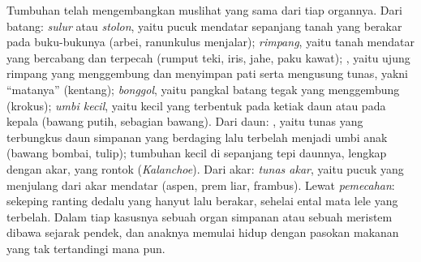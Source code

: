 \begin{proposition}\label{prop:b2:asexual-reproduction:organs}
Tumbuhan telah mengembangkan muslihat yang sama dari tiap organnya.
Dari batang: \emph{sulur} atau \emph{stolon}, yaitu pucuk mendatar
sepanjang tanah yang berakar pada buku-bukunya (arbei, ranunkulus
menjalar); \emph{rimpang}, yaitu  tanah mendatar yang
bercabang dan terpecah (rumput teki, iris, jahe, paku kawat);
\emph{}, yaitu ujung rimpang yang menggembung dan menyimpan
pati serta mengusung tunas, yakni ``matanya'' (kentang); \emph{bonggol},
yaitu pangkal batang tegak yang menggembung (krokus); \emph{umbi
kecil}, yaitu  kecil yang terbentuk pada ketiak daun atau
pada kepala  (bawang putih, sebagian bawang). Dari daun:
\emph{}, yaitu tunas yang terbungkus daun simpanan yang
berdaging lalu terbelah menjadi umbi anak (bawang bombai, tulip);
tumbuhan kecil di sepanjang tepi daunnya, lengkap dengan akar, yang
rontok (\emph{Kalanchoe}). Dari akar: \emph{tunas akar}, yaitu pucuk
yang menjulang dari akar mendatar (aspen, prem liar, frambus). Lewat
\emph{pemecahan}: sekeping ranting dedalu yang hanyut lalu berakar,
sehelai ental mata lele yang terbelah. Dalam tiap kasusnya sebuah organ
simpanan atau sebuah meristem dibawa sejarak pendek, dan anaknya memulai
hidup dengan pasokan makanan yang tak tertandingi  mana pun.
\end{proposition}

